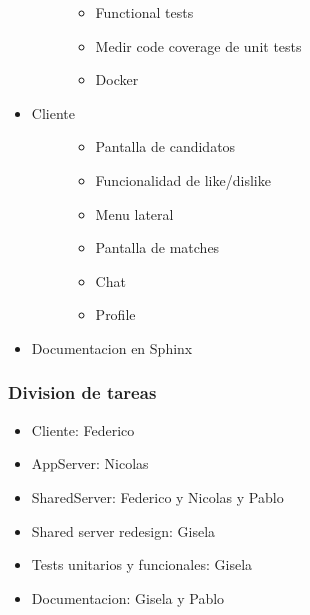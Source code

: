 \documentclass[letterpaper,10pt,english]{sphinxmanual}
\begin{document}
\begin{itemize}
\begin{description}
\begin{itemize}
\item {} 
Functional tests

\item {} 
Medir code coverage de unit tests

\item {} 
Docker

\end{itemize}

\end{description}

\item {} \begin{description}
\item[{Cliente}] \leavevmode\begin{itemize}
\item {} 
Pantalla de candidatos

\item {} 
Funcionalidad de like/dislike

\item {} 
Menu lateral

\item {} 
Pantalla de matches

\item {} 
Chat

\item {} 
Profile

\end{itemize}

\end{description}

\item {} 
Documentacion en Sphinx

\end{itemize}


\subsubsection{Division de tareas}
\label{manuals:id7}\begin{itemize}
\item {} 
Cliente: Federico

\item {} 
AppServer:  Nicolas

\item {} 
SharedServer: Federico y Nicolas y Pablo

\item {} 
Shared server redesign: Gisela

\item {} 
Tests unitarios y funcionales: Gisela

\item {} 
Documentacion: Gisela y Pablo

\end{itemize}
\end{document}
